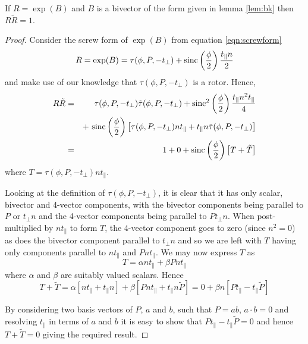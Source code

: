 \begin{thm} If $R = \exp(B)$ and $B$ is a bivector of the form 
given in lemma
\ref{lem:bk} then $R\tilde{R} = 1$.
\end{thm}
\begin{proof}
Consider the screw form of $\exp(B)$ from equation \ref{eqn:screwform}
\[
R = \exp(B) =
\tau(\phi, P, - t_\perp) + \mathrm{sinc}\left(\frac{\phi}{2}\right)\frac{t_\parallel n}{2}
\]
and make use of our knowledge that $\tau(\phi, P, - t_\perp)$ is a rotor.
Hence,
\begin{eqnarray*}
R\tilde{R} & = & \tau(\phi, P, - t_\perp)\tilde{\tau}(\phi, P, - t_\perp)
+ \mathrm{sinc}^2\left(\frac{\phi}{2}\right)
\frac{t_\parallel n^2 t_\parallel}{4}\\
&& + \ \mathrm{sinc}\left(\frac{\phi}{2}\right)
\left[ \tau(\phi, P, - t_\perp)nt_\parallel + 
       t_\parallel n\tilde{\tau}(\phi, P, - t_\perp) \right] \\
& = & 1 + 0 + \mathrm{sinc}\left(\frac{\phi}{2}\right)
\left[ T + \tilde{T} \right]
\end{eqnarray*}
where $T = \tau(\phi, P, - t_\perp)nt_\parallel$.

Looking at the definition of $\tau(\phi, P, - t_\perp)$, it is clear
that it has only scalar, bivector and 4-vector components, with
the bivector components being parallel to $P$ or $t_\perp n$ and
the 4-vector components being parallel to $Pt_\perp n$. When
post-multiplied by $nt_\parallel$ to form $T$, the 4-vector component
goes to zero (since $n^2 = 0$) as does the bivector component
parallel to $t_\perp n$ and so we are left with $T$ having only
components parallel to $nt_\parallel$ and $Pnt_\parallel$. 
We may now express $T$ as
\[
T = \alpha nt_\parallel + \beta Pnt_\parallel
\]
where $\alpha$ and $\beta$ are suitably valued scalars. Hence
\[
T + \tilde{T} = \alpha \left[ nt_\parallel + t_\parallel n \right]
+ \beta \left[ Pnt_\parallel + t_\parallel n\tilde{P} \right] 
= 0 + \beta n \left[ Pt_\parallel - t_\parallel \tilde{P} \right]
\]

By considering two basis vectors of $P$, $a$ and $b$, such
that $P = ab$, $a \cdot b = 0$ and resolving $t_\parallel$ in 
terms of $a$ and $b$ it is easy to show that 
$Pt_\parallel - t_\parallel\tilde{P} = 0$ and hence
$T + \tilde{T} = 0$ giving the required result.
\end{proof}

